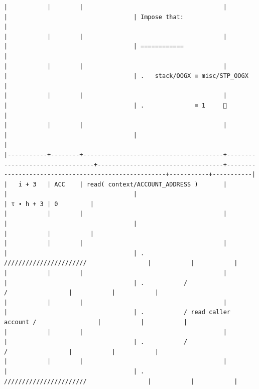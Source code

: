 \documentclass[varwidth=\maxdimen,margin=0.5cm,multi={verbatim}]{standalone}
\begin{document}
\begin{verbatim}
|           |        |                                       |                                 |                                   | Impose that:                                        |
|           |        |                                       |                                 |                                   | ============                                        |
|           |        |                                       |                                 |                                   | .   stack/OOGX ≡ misc/STP_OOGX                      |
|           |        |                                       |                                 |                                   | .              ≡ 1     👋                           |
|           |        |                                       |                                 |                                   |                                                     |
|-----------+--------+---------------------------------------+---------------------------------+-----------------------------------+-----------------------------------------------------+-----------+-----------|
|   i + 3   | ACC    | read( context/ACCOUNT_ADDRESS )       |                                 |                                   |                                                     | τ ∙ h + 3 | 0         |
|           |        |                                       |                                 |                                   |                                                     |           |           |
|           |        |                                       |                                 |                                   | .           ///////////////////////                 |           |           |
|           |        |                                       |                                 |                                   | .           /                     /                 |           |           |
|           |        |                                       |                                 |                                   | .           / read caller account /                 |           |           |
|           |        |                                       |                                 |                                   | .           /                     /                 |           |           |
|           |        |                                       |                                 |                                   | .           ///////////////////////                 |           |           |

\end{verbatim}
\end{document}
